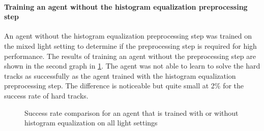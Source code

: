 \paragraph{Training an agent without the histogram equalization preprocessing step}
An agent without the histogram equalization preprocessing step was trained on the mixed light setting to determine if the preprocessing step is required for high performance. The results of training an agent without the preprocessing step are shown in the second graph in \ref{fig:hardDistance_mixedLight_noHistogramEqualizationTraining_results}. The agent was not able to learn to solve the hard tracks as successfully as the agent trained with the histogram equalization preprocessing step. The difference is noticeable but quite small at 2\% for the success rate of hard tracks.

\begin{figure}
    \centering
    \caption{Success rate comparison for an agent that is trained with or without histogram equalization on all light settings}
    \label{fig:hardDistance_mixedLight_noHistogramEqualizationTraining_results}
\end{figure}



%

